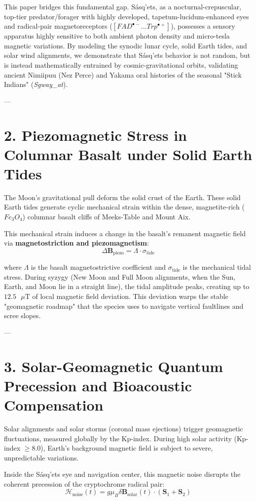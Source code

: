 \documentclass[11pt,twocolumn]{article}
\begin{document}
This paper bridges this fundamental gap. Sásq'ets, as a nocturnal-crepuscular, top-tier predator/forager with highly developed, tapetum-lucidum-enhanced eyes and radical-pair magnetoreceptors ($[FAD^{\bullet -} \dots Trp^{\bullet +}]$), possesses a sensory apparatus highly sensitive to both ambient photon density and micro-tesla magnetic variations. By modeling the synodic lunar cycle, solid Earth tides, and solar wind alignments, we demonstrate that Sásq'ets behavior is not random, but is instead mathematically entrained by cosmic-gravitational orbits, validating ancient Nimiipuu (Nez Perce) and Yakama oral histories of the seasonal "Stick Indians" (\textit{Sgway_at}).

---

\section{2. Piezomagnetic Stress in Columnar Basalt under Solid Earth Tides}
The Moon's gravitational pull deform the solid crust of the Earth. These solid Earth tides generate cyclic mechanical strain within the dense, magnetite-rich ($Fe_3O_4$) columnar basalt cliffs of Meeks-Table and Mount Aix. 

This mechanical strain induces a change in the basalt's remanent magnetic field via \textbf{magnetostriction and piezomagnetism}:
$$\Delta \mathbf{B}_{\text{piezo}} = \Lambda \cdot \sigma_{\text{tide}}$$

where $\Lambda$ is the basalt magnetostrictive coefficient and $\sigma_{\text{tide}}$ is the mechanical tidal stress. During syzygy (New Moon and Full Moon alignments, when the Sun, Earth, and Moon lie in a straight line), the tidal amplitude peaks, creating up to \textbf{$12.5\text{ }\mu\text{T}$} of local magnetic field deviation. This deviation warps the stable "geomagnetic roadmap" that the species uses to navigate vertical faultlines and scree slopes.

---

\section{3. Solar-Geomagnetic Quantum Precession and Bioacoustic Compensation}
Solar alignments and solar storms (coronal mass ejections) trigger geomagnetic fluctuations, measured globally by the Kp-index. During high solar activity (Kp-index $\geq 8.0$), Earth's background magnetic field is subject to severe, unpredictable variations.

Inside the Sásq'ets eye and navigation center, this magnetic noise disrupts the coherent precession of the cryptochrome radical pair:
$$\mathcal{H}_{\text{noise}}(t) = g \mu_B \delta \mathbf{B}_{\text{solar}}(t) \cdot \left(\mathbf{S}_1 + \mathbf{S}_2\right)$$
\end{document}
